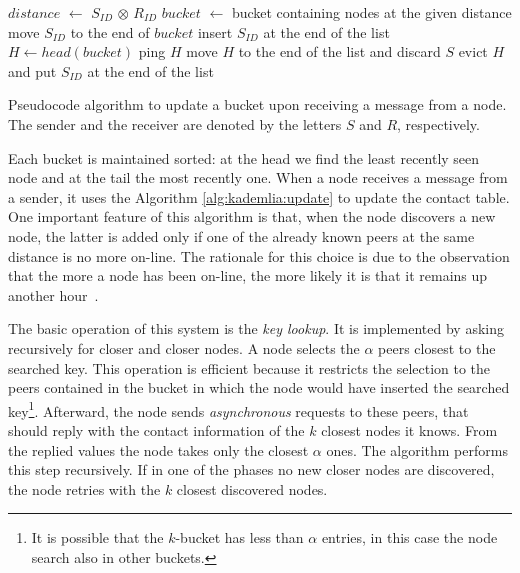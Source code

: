 \begin{algorithm}[t]
    \begin{algorithmic}
        \State $distance$ $\gets$ $S_{ID}$ $\otimes$ $R_{ID}$
        \State $bucket$ $\gets$ bucket containing nodes at the given distance
        \State move $S_{ID}$ to the end of $bucket$
        \Else
        \State insert $S_{ID}$ at the end of the list
        \Else
        \State $H \gets head(bucket)$
        \State ping $H$
        \State move $H$ to the end of the list and discard $S$
        \Else
        \State evict $H$ and put $S_{ID}$ at the end of the list
        \EndIf
        \EndIf
        \EndIf
    \end{algorithmic}
    \caption{Pseudocode algorithm to update a bucket upon receiving a message
    from a node. The sender and the receiver are denoted by the letters $S$ and
    $R$, respectively.}
    \label{alg:kademlia:update}
\end{algorithm}

Each bucket is maintained sorted: at the head we find the least recently seen
node and at the tail the most recently one. When a node receives a message from
a sender, it uses the Algorithm \autoref{alg:kademlia:update} to update the
contact table. One important feature of this algorithm is that, when the node
discovers a new node, the latter is added only if one of the already known peers
at the same distance is no more on-line. The rationale for this choice is due to
the observation that the more a node has been on-line, the more likely it is
that it remains up another hour~\cite{bib:kademlia}.

The basic operation of this system is the \emph{key lookup}. It is implemented
by asking recursively for closer and closer nodes. A node selects the $\alpha$
peers closest to the searched key. This operation is efficient because it
restricts the selection to the peers contained in the bucket in which the node
would have inserted the searched key\footnote{It is possible that the $k$-bucket
has less than $\alpha$ entries, in this case the node search also in other
buckets.}. Afterward, the node sends \emph{asynchronous} requests to these
peers, that should reply with the contact information of the $k$ closest nodes
it knows. From the replied values the node takes only the closest $\alpha$ ones.
The algorithm performs this step recursively. If in one of the phases no new
closer nodes are discovered, the node retries with the $k$ closest discovered
nodes.

